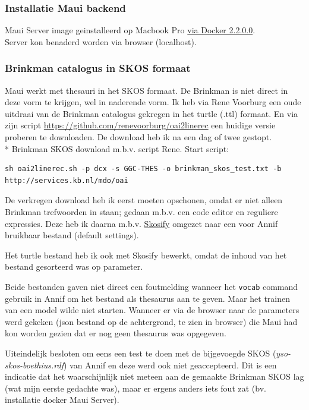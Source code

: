 \documentclass{article}
\begin{document}
\subsubsection{Installatie Maui backend}

Maui Server image geinstalleerd op Macbook Pro \href{https://github.com/NatLibFi/MauiServer/tree/dockerization#usage-with-docker}{via Docker 2.2.0.0}. \\
Server kon benaderd worden via browser (localhost). 


\subsubsection{Brinkman catalogus in SKOS formaat}

Maui werkt met thesauri in het SKOS formaat. De Brinkman is niet direct in deze vorm te krijgen, wel in naderende vorm. Ik heb via Rene Voorburg een oude uitdraai van de Brinkman catalogus gekregen in het turtle (.ttl) formaat. En via zijn script \url{https://github.com/renevoorburg/oai2linerec} een huidige versie proberen te downloaden. De download heb ik na een dag of twee gestopt.
\\*
Brinkman SKOS download m.b.v. script Rene. Start script:
\begin{lstlisting}
sh oai2linerec.sh -p dcx -s GGC-THES -o brinkman_skos_test.txt -b http://services.kb.nl/mdo/oai
\end{lstlisting}

De verkregen download heb ik eerst moeten opschonen, omdat er niet alleen Brinkman trefwoorden in staan; gedaan m.b.v. een code editor en reguliere expressies. Deze heb ik daarna m.b.v. \href{https://github.com/NatLibFi/Skosify}{Skosify} omgezet naar een voor Annif bruikbaar bestand (default settings).

Het turtle bestand heb ik ook met Skosify bewerkt, omdat de inhoud van het bestand gesorteerd was op parameter.

Beide bestanden gaven niet direct een foutmelding wanneer het \texttt{vocab} command gebruik in Annif om het bestand als thesaurus aan te geven. Maar het trainen van een model wilde niet starten. Wanneer er via de browser naar de parameters werd gekeken (json bestand op de achtergrond, te zien in browser) die Maui had kon worden gezien dat er nog geen thesaurus was opgegeven. 

Uiteindelijk besloten om eens een test te doen met de bijgevoegde SKOS (\textit{yso-skos-boethius.rdf}) van Annif en deze werd ook niet geaccepteerd. Dit is een indicatie dat het waarschijnlijk niet meteen aan de gemaakte Brinkman SKOS lag (wat mijn eerste gedachte was), maar er ergens anders iets fout zat (bv. installatie docker Maui Server).
\end{document}
